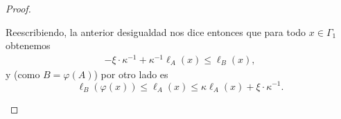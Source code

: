 \documentclass[11pt]{article}
\theoremstyle{colored}
\begin{document}
\begin{proof}
\begin{itemize}[listparindent = \parindent]
\begin{itemize}[listparindent = \parindent]
Reescribiendo, la anterior desigualdad nos dice entonces que para todo $x \in \Gamma_1$ obtenemos  
\begin{align*}
-\xi \cdot \kappa^{-1} + \kappa^{-1} \ell_A(x) \leq \ell_B(x),
\end{align*}
y (como $B = \varphi(A)$) por otro lado es
\[
\ell_B(\varphi(x)) \leq \ell_A(x) \leq \kappa\ell_A(x) + \xi \cdot \kappa^{-1}.
\]
\end{itemize}
\end{itemize}
\end{proof}
\end{document}
